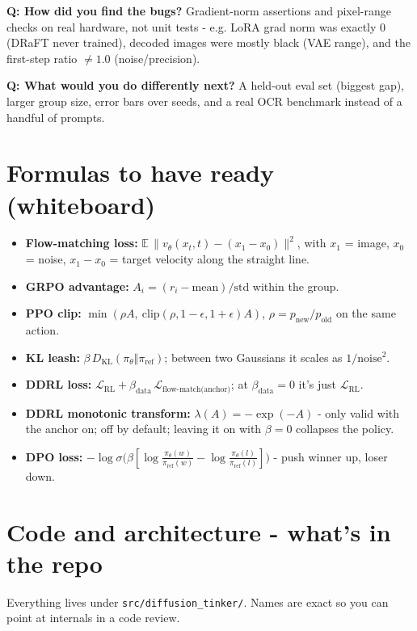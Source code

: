 \documentclass[11pt]{article}
\newcommand{\code}[1]{\texttt{\small #1}}
\begin{document}
\textbf{Q: How did you find the bugs?} Gradient-norm assertions and pixel-range checks
on real hardware, not unit tests - e.g. LoRA grad norm was exactly 0 (DRaFT never
trained), decoded images were mostly black (VAE range), and the first-step ratio
$\ne 1.0$ (noise/precision).

\textbf{Q: What would you do differently next?} A held-out eval set (biggest gap),
larger group size, error bars over seeds, and a real OCR benchmark instead of a handful
of prompts.

\section{Formulas to have ready (whiteboard)}

\begin{itemize}
\item \textbf{Flow-matching loss:} $\mathbb E\,\lVert v_\theta(x_t,t)-(x_1-x_0)\rVert^2$,
with $x_1$ = image, $x_0$ = noise, $x_1-x_0$ = target velocity along the straight line.
\item \textbf{GRPO advantage:} $A_i = (r_i - \text{mean})/\text{std}$ within the group.
\item \textbf{PPO clip:} $\min(\rho A,\ \text{clip}(\rho,1{-}\epsilon,1{+}\epsilon)A)$,
$\rho = p_{\text{new}}/p_{\text{old}}$ on the same action.
\item \textbf{KL leash:} $\beta\, D_{\text{KL}}(\pi_\theta \Vert \pi_{\text{ref}})$;
between two Gaussians it scales as $1/\text{noise}^2$.
\item \textbf{DDRL loss:} $\mathcal L_{\text{RL}} + \beta_{\text{data}}\,
\mathcal L_{\text{flow-match(anchor)}}$; at $\beta_{\text{data}}{=}0$ it's just
$\mathcal L_{\text{RL}}$.
\item \textbf{DDRL monotonic transform:} $\lambda(A)=-\exp(-A)$ - only valid with the
anchor on; off by default; leaving it on with $\beta{=}0$ collapses the policy.
\item \textbf{DPO loss:} $-\log\sigma\!\big(\beta[\log\frac{\pi_\theta(w)}{\pi_{\text{ref}}(w)}
- \log\frac{\pi_\theta(l)}{\pi_{\text{ref}}(l)}]\big)$ - push winner up, loser down.
\end{itemize}

\section{Code and architecture - what's in the repo}

Everything lives under \code{src/diffusion\_tinker/}. Names are exact so you can point
at internals in a code review.
\end{document}
